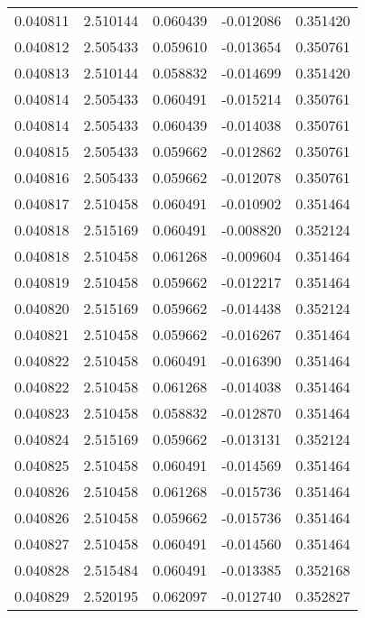 \begin{tabular}{lrrrr}
0.040811    &  2.510144 &  0.060439 & -0.012086 &             0.351420 \\
0.040812    &  2.505433 &  0.059610 & -0.013654 &             0.350761 \\
0.040813    &  2.510144 &  0.058832 & -0.014699 &             0.351420 \\
0.040814    &  2.505433 &  0.060491 & -0.015214 &             0.350761 \\
0.040814    &  2.505433 &  0.060439 & -0.014038 &             0.350761 \\
0.040815    &  2.505433 &  0.059662 & -0.012862 &             0.350761 \\
0.040816    &  2.505433 &  0.059662 & -0.012078 &             0.350761 \\
0.040817    &  2.510458 &  0.060491 & -0.010902 &             0.351464 \\
0.040818    &  2.515169 &  0.060491 & -0.008820 &             0.352124 \\
0.040818    &  2.510458 &  0.061268 & -0.009604 &             0.351464 \\
0.040819    &  2.510458 &  0.059662 & -0.012217 &             0.351464 \\
0.040820    &  2.515169 &  0.059662 & -0.014438 &             0.352124 \\
0.040821    &  2.510458 &  0.059662 & -0.016267 &             0.351464 \\
0.040822    &  2.510458 &  0.060491 & -0.016390 &             0.351464 \\
0.040822    &  2.510458 &  0.061268 & -0.014038 &             0.351464 \\
0.040823    &  2.510458 &  0.058832 & -0.012870 &             0.351464 \\
0.040824    &  2.515169 &  0.059662 & -0.013131 &             0.352124 \\
0.040825    &  2.510458 &  0.060491 & -0.014569 &             0.351464 \\
0.040826    &  2.510458 &  0.061268 & -0.015736 &             0.351464 \\
0.040826    &  2.510458 &  0.059662 & -0.015736 &             0.351464 \\
0.040827    &  2.510458 &  0.060491 & -0.014560 &             0.351464 \\
0.040828    &  2.515484 &  0.060491 & -0.013385 &             0.352168 \\
0.040829    &  2.520195 &  0.062097 & -0.012740 &             0.352827 \\

\end{tabular}
